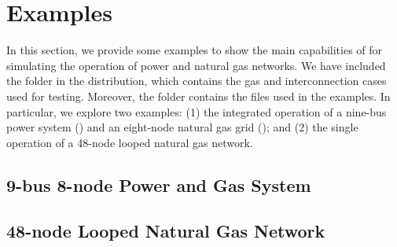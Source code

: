 \chapter{Examples}
\label{chap:examples}

In this section, we provide some examples to show the main capabilities of \mpng{} for simulating the operation of power and natural gas networks. We have included the folder \mpngcasepath{} in the distribution, which contains the gas and interconnection cases used for testing. Moreover, the folder \mpngexamplepath{} contains the files used in the examples. In particular, we explore two examples: (1) the integrated operation of a nine-bus power system () and an eight-node natural gas grid (); and (2) the single operation of a 48-node looped natural gas network.

\section{9-bus 8-node Power and Gas System}
\label{sec:8-9_gas_power}



\section{48-node Looped Natural Gas Network}
\label{sec:48_gas}
